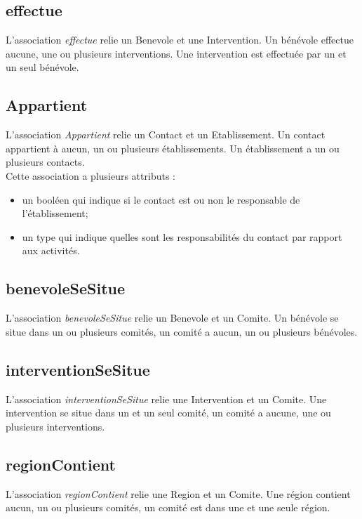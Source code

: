\documentclass[asi, sansVersion]{picInsa}
\begin{document}
\subsection*{effectue} 

L'association \textit{effectue} relie un Benevole et une Intervention. Un bénévole effectue aucune, une ou plusieurs interventions. Une intervention est effectuée par un et un seul bénévole. 

\subsection*{Appartient}

L'association \textit{Appartient} relie un Contact et un Etablissement. Un contact appartient à aucun, un ou plusieurs établissements. Un établissement a un ou plusieurs contacts.\\
Cette association a plusieurs attributs :
\begin{itemize}
\item un booléen qui indique si le contact est ou non le responsable de l'établissement; 
\item un type qui indique quelles sont les responsabilités du contact par rapport aux activités.
\end{itemize}


\subsection*{benevoleSeSitue}

L'association \textit{benevoleSeSitue} relie un Benevole et un Comite. Un bénévole se situe dans un ou plusieurs comités, un comité a aucun, un ou plusieurs bénévoles.

\subsection*{interventionSeSitue}

L'association \textit{interventionSeSitue} relie une Intervention et un Comite. Une intervention se situe dans un et un seul comité, un comité a aucune, une ou plusieurs interventions.

\subsection*{regionContient}

L'association \textit{regionContient} relie une Region et un Comite. Une région contient aucun, un ou plusieurs comités, un comité est dans une et une seule région.
\end{document}
